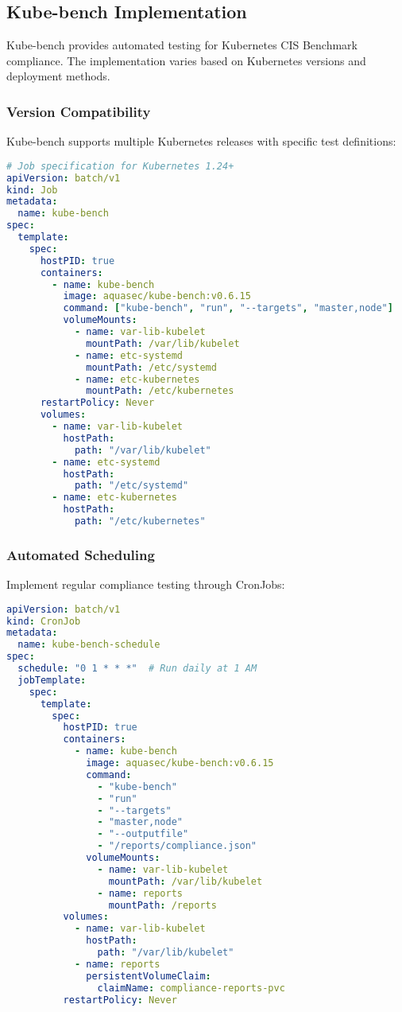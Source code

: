 \documentclass[PMO,lsstdraft,authoryear,toc]{lsstdoc}
\begin{document}
\subsection{Kube-bench Implementation}

Kube-bench provides automated testing for Kubernetes CIS Benchmark compliance. The implementation varies based on Kubernetes versions and deployment methods.

\subsubsection{Version Compatibility}

Kube-bench supports multiple Kubernetes releases with specific test definitions:

\begin{lstlisting}[language=yaml]
# Job specification for Kubernetes 1.24+
apiVersion: batch/v1
kind: Job
metadata:
  name: kube-bench
spec:
  template:
    spec:
      hostPID: true
      containers:
        - name: kube-bench
          image: aquasec/kube-bench:v0.6.15
          command: ["kube-bench", "run", "--targets", "master,node"]
          volumeMounts:
            - name: var-lib-kubelet
              mountPath: /var/lib/kubelet
            - name: etc-systemd
              mountPath: /etc/systemd
            - name: etc-kubernetes
              mountPath: /etc/kubernetes
      restartPolicy: Never
      volumes:
        - name: var-lib-kubelet
          hostPath:
            path: "/var/lib/kubelet"
        - name: etc-systemd
          hostPath:
            path: "/etc/systemd"
        - name: etc-kubernetes
          hostPath:
            path: "/etc/kubernetes"
\end{lstlisting}

\subsubsection{Automated Scheduling}

Implement regular compliance testing through CronJobs:

\begin{lstlisting}[language=yaml]
apiVersion: batch/v1
kind: CronJob
metadata:
  name: kube-bench-schedule
spec:
  schedule: "0 1 * * *"  # Run daily at 1 AM
  jobTemplate:
    spec:
      template:
        spec:
          hostPID: true
          containers:
            - name: kube-bench
              image: aquasec/kube-bench:v0.6.15
              command: 
                - "kube-bench"
                - "run"
                - "--targets"
                - "master,node"
                - "--outputfile"
                - "/reports/compliance.json"
              volumeMounts:
                - name: var-lib-kubelet
                  mountPath: /var/lib/kubelet
                - name: reports
                  mountPath: /reports
          volumes:
            - name: var-lib-kubelet
              hostPath:
                path: "/var/lib/kubelet"
            - name: reports
              persistentVolumeClaim:
                claimName: compliance-reports-pvc
          restartPolicy: Never
\end{lstlisting}
\end{document}
